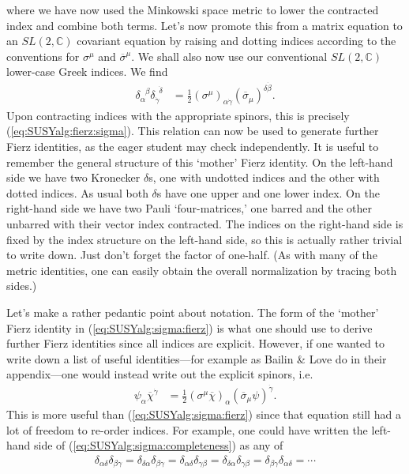 where we have now used the Minkowski space metric to lower the contracted index and combine both terms. Let's now promote this from a matrix equation to an  $SL(2,\mathbb C)$ covariant equation by raising and dotting indices according to the conventions for $\sigma^\mu$ and $\overline\sigma^\mu$. We shall also now use our conventional $SL(2,\mathbb C)$ lower-case Greek indices. We find
\begin{align}
    \delta_\alpha^{\phantom\alpha\beta}\delta_{\dot\gamma}^{\phantom\gamma\dot\delta} &= \frac 12 (\sigma^\mu)_{\alpha\dot\gamma}(\overline\sigma_\mu)^{\delta\dot\beta}.\label{eq:SUSYalg:sigma:fierz}
\end{align}
Upon contracting indices with the appropriate spinors, this is precisely  (\ref{eq:SUSYalg:fierz:sigma}). This relation can now be used to generate further Fierz identities, as the eager student may check independently. It is useful to remember the general structure of this `mother' Fierz identity. On the left-hand side we have two Kronecker $\delta$s, one with undotted indices and the other with dotted indices. As usual both $\delta$s have one upper and one lower index. On the right-hand side we have two Pauli `four-matrices,' one barred and the other unbarred with their vector index contracted. The indices on the right-hand side is fixed by the index structure on the left-hand side, so this is actually rather trivial to write down. Just don't forget the factor of one-half. (As with many of the metric identities, one can easily obtain the overall normalization by tracing both sides.)

\begin{example}
Let's make a rather pedantic point about notation. The form of the `mother' Fierz identity in  (\ref{eq:SUSYalg:sigma:fierz}) is what one should use to derive further Fierz identities since all indices are explicit. However, if one wanted to write down a list of useful identities---for example as Bailin \& Love\autocite{Bailin:1994qt} do in their appendix---one would instead write out the explicit spinors, i.e.
  \begin{align}
      \psi_\alpha\overline\chi^{\dot\gamma} &= \frac 12 (\sigma^\mu\overline\chi)_\alpha(\overline\sigma_\mu\psi)^{\dot\gamma}.
  \end{align}
This is more useful than  (\ref{eq:SUSYalg:sigma:fierz}) since that equation still had a lot of freedom to re-order indices. For example, one could have written the left-hand side of  (\ref{eq:SUSYalg:sigma:completeness}) as any of
\begin{align}
  \delta_{\alpha\delta}\delta_{\beta\gamma} = \delta_{\delta\alpha}\delta_{\beta\gamma} = \delta_{\alpha\delta}\delta_{\gamma\beta} = \delta_{\delta\alpha}\delta_{\gamma\beta} = \delta_{\beta\gamma}\delta_{\alpha\delta} = \cdots
\end{align}
\end{example}

